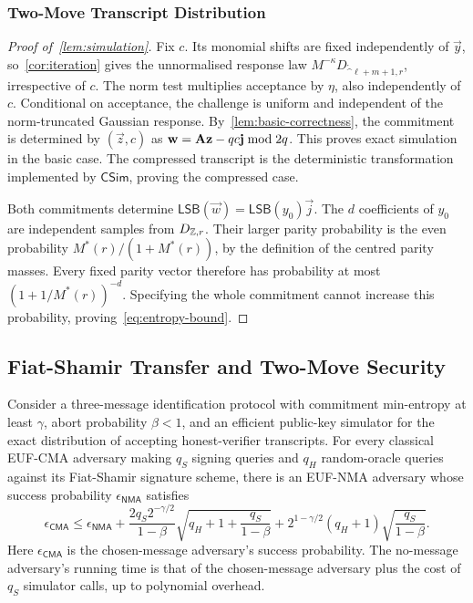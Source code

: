 \subsubsection{Two-Move Transcript Distribution}

\begin{proof}[Proof of~\cref{lem:simulation}]
Fix $c$. Its monomial shifts are fixed independently of $\vec y$, so~\cref{cor:iteration} gives the unnormalised response law $M^{-\kappa}D_{\ring^{\ell+m+1},r}$, irrespective of $c$. The norm test multiplies acceptance by $\eta$, also independently of $c$. Conditional on acceptance, the challenge is uniform and independent of the norm-truncated Gaussian response. By~\cref{lem:basic-correctness}, the commitment is determined by $(\vec z,c)$ as $\mathbf{w}=\mathbf{A}\mathbf{z}-qc\mathbf{j}\bmod2q$. This proves exact simulation in the basic case. The compressed transcript is the deterministic transformation implemented by $\mathsf{CSim}$, proving the compressed case.

Both commitments determine $\mathsf{LSB}(\vec w)=\mathsf{LSB}(y_0)\vec j$. The $d$ coefficients of $y_0$ are independent samples from $D_{\mathbb{Z},r}$. Their larger parity probability is the even probability $M^*(r)/(1+M^*(r))$, by the definition of the centred parity masses. Every fixed parity vector therefore has probability at most $(1+1/M^*(r))^{-d}$. Specifying the whole commitment cannot increase this probability, proving~\cref{eq:entropy-bound}.
\end{proof}

\subsection{Fiat-Shamir Transfer and Two-Move Security}

\begin{lemma}
\label{lem:fs-transfer}
Consider a three-message identification protocol with commitment min-entropy at least $\gamma$, abort probability $\beta<1$, and an efficient public-key simulator for the exact distribution of accepting honest-verifier transcripts. For every classical EUF-CMA adversary making $q_S$ signing queries and $q_H$ random-oracle queries against its Fiat-Shamir signature scheme, there is an EUF-NMA adversary whose success probability $\epsilon_{\mathsf{NMA}}$ satisfies
\[
 \epsilon_{\mathsf{CMA}}\le\epsilon_{\mathsf{NMA}}
 +\frac{2q_S2^{-\gamma/2}}{1-\beta}\sqrt{q_H+1+\frac{q_S}{1-\beta}}
 +2^{1-\gamma/2}(q_H+1)\sqrt{\frac{q_S}{1-\beta}}.
\]
Here $\epsilon_{\mathsf{CMA}}$ is the chosen-message adversary's success probability. The no-message adversary's running time is that of the chosen-message adversary plus the cost of $q_S$ simulator calls, up to polynomial overhead.
\end{lemma}

